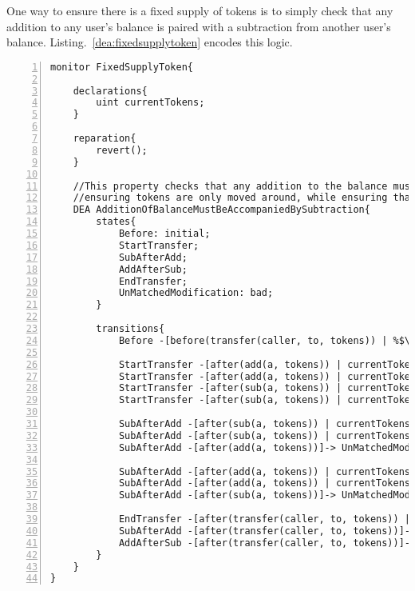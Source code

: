 \documentclass{article}
\newcommand{\tildearrow}{{\raise.37ex\hbox{$\scriptstyle\mathtt{\sim}$}}\hspace{-0.08cm}>\xspace}
\begin{document}
    One way to ensure there is a fixed supply of tokens is to simply check that any addition to any user's balance is paired with a subtraction from another user's balance. Listing.~\ref{dea:fixedsupplytoken} encodes this logic. 
    
        \small\begin{lstlisting}[language=DEA,basicstyle=\scriptsize,numbers=left,numbersep=2pt,xleftmargin=0.3cm,escapechar=\%,label={dea:fixedsupplytoken},caption={Monitor that checks that an addition in tokens is accompanied with an equal subtraction.}]
monitor FixedSupplyToken{
  
    declarations{
        uint currentTokens;
    }
    
    reparation{
        revert();
    }

    //This property checks that any addition to the balance must be coupled immediately with a subtraction,
    //ensuring tokens are only moved around, while ensuring that any change is immediately (modulo one step) reflected in the total sum.
    DEA AdditionOfBalanceMustBeAccompaniedBySubtraction{
        states{
            Before: initial;
            StartTransfer;
            SubAfterAdd;
            AddAfterSub;
            EndTransfer;
            UnMatchedModification: bad;
        }
    
        transitions{
            Before -[before(transfer(caller, to, tokens)) | %$\tildearrow$% currentTokens = tokens;]-> StartTransfer;
            
            StartTransfer -[after(add(a, tokens)) | currentTokens == tokens]-> SubAfterAdd;
            StartTransfer -[after(add(a, tokens)) | currentTokens != tokens]-> UnMatchedModification;
            StartTransfer -[after(sub(a, tokens)) | currentTokens == tokens]-> AddAfterSub;
            StartTransfer -[after(sub(a, tokens)) | currentTokens != tokens]-> UnMatchedModification;
            
            SubAfterAdd -[after(sub(a, tokens)) | currentTokens == tokens]-> EndTransfer;
            SubAfterAdd -[after(sub(a, tokens)) | currentTokens != tokens]-> UnMatchedModification;
            SubAfterAdd -[after(add(a, tokens))]-> UnMatchedModification;
            
            SubAfterAdd -[after(add(a, tokens)) | currentTokens == tokens]-> EndTransfer;
            SubAfterAdd -[after(add(a, tokens)) | currentTokens != tokens]-> UnMatchedModification;
            SubAfterAdd -[after(sub(a, tokens))]-> UnMatchedModification;
        
            EndTransfer -[after(transfer(caller, to, tokens)) | %$\tildearrow$% currentTokens = 0;]-> Before;
            SubAfterAdd -[after(transfer(caller, to, tokens))]-> UnMatchedModification;
            AddAfterSub -[after(transfer(caller, to, tokens))]-> UnMatchedModification;
        }
    }
}
            \end{lstlisting}\normalsize
            
\end{document}
